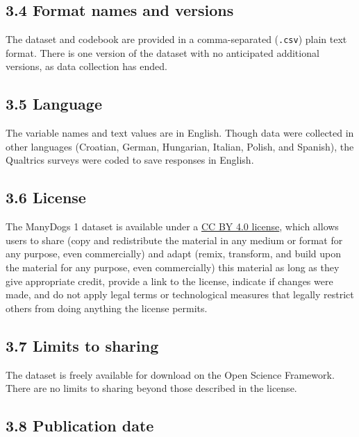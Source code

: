 \documentclass[
  pub,floatsintext]{apa6}
\begin{document}
\hypertarget{format-names-and-versions}{%
\subsection{3.4 Format names and versions}\label{format-names-and-versions}}

The dataset and codebook are provided in a comma-separated (\texttt{.csv}) plain text format. There is one version of the dataset with no anticipated additional versions, as data collection has ended.

\hypertarget{language}{%
\subsection{3.5 Language}\label{language}}

The variable names and text values are in English. Though data were collected in other languages (Croatian, German, Hungarian, Italian, Polish, and Spanish), the Qualtrics surveys were coded to save responses in English.

\hypertarget{license}{%
\subsection{3.6 License}\label{license}}

The ManyDogs 1 dataset is available under a \href{https://creativecommons.org/licenses/by/4.0/}{CC BY 4.0 license}, which allows users to share (copy and redistribute the material in any medium or format for any purpose, even commercially) and adapt (remix, transform, and build upon the material for any purpose, even commercially) this material as long as they give appropriate credit, provide a link to the license, indicate if changes were made, and do not apply legal terms or technological measures that legally restrict others from doing anything the license permits.

\hypertarget{limits-to-sharing}{%
\subsection{3.7 Limits to sharing}\label{limits-to-sharing}}

The dataset is freely available for download on the Open Science Framework. There are no limits to sharing beyond those described in the license.

\hypertarget{publication-date}{%
\subsection{3.8 Publication date}\label{publication-date}}
\end{document}
